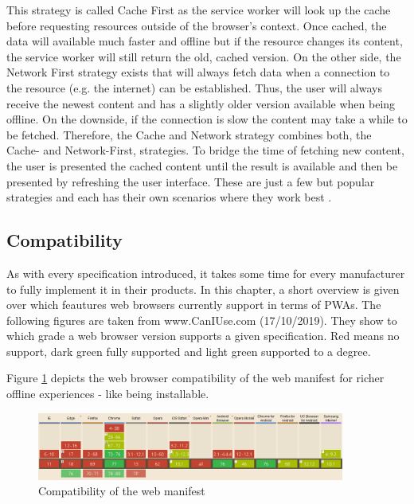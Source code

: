This strategy is called Cache First as the service worker will look up the cache before requesting resources outside of the browser’s context. Once cached, the data will available much faster and offline but if the resource changes its content, the service worker will still return the old, cached version. On the other side, the Network First strategy exists that will always fetch data when a connection to the resource (e.g. the internet) can be established. Thus, the user will always receive the newest content and has a slightly older version available when being offline. On the downside, if the connection is slow the content may take a while to be fetched. Therefore, the Cache and Network strategy combines both, the Cache- and Network-First, strategies. To bridge the time of fetching new content, the user is presented the cached content until the result is available and then be presented by refreshing the user interface. These are just a few but popular strategies and each has their own scenarios where they work best \cite[pp. 109-111]{hajianProgressiveWebApps2019}.

\subsection{Compatibility}
\label{sec:theorieCd}


As with every specification introduced, it takes some time for every manufacturer to fully implement it in their products. In this chapter, a short overview is given over which feautures web browsers currently support in terms of  \acs{PWA}s. The following figures are taken from www.CanIUse.com (17/10/2019). They show to which grade a web browser version supports a given specification. Red means no support, dark green fully supported and light green supported to a degree.

Figure \ref{fig:pwacompatibilitywebmanifest} depicts the web browser compatibility of the web manifest for richer offline experiences - like being installable.

\begin{figure}[htbp] 
	\centering
	\includegraphics[width=0.9\textwidth]{Assets/chapter_pwa/webmanifestsupport.PNG}
	\caption{Compatibility of the web manifest}
	\label{fig:pwacompatibilitywebmanifest}
\end{figure}


